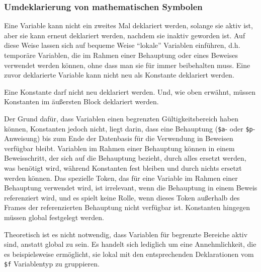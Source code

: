 \subsubsection{Umdeklarierung von mathematischen Symbolen}
\label{redeclaration}


Eine Variable kann nicht ein zweites Mal deklariert werden, solange sie aktiv ist, aber sie kann erneut deklariert werden, nachdem sie inaktiv geworden ist.  Auf diese Weise lassen sich auf bequeme Weise "`lokale"' Variablen einführen, d.h. temporäre Variablen, die im Rahmen einer Behauptung oder eines Beweises verwendet werden können, ohne dass man sie für immer beibehalten muss.  Eine zuvor deklarierte Variable kann nicht neu als Konstante deklariert werden.

Eine Konstante darf nicht neu deklariert werden.  Und, wie oben erwähnt, müssen Konstanten im äußersten Block deklariert werden.

Der Grund dafür, dass Variablen einen begrenzten Gültigkeitsbereich haben können, Konstanten jedoch nicht, liegt darin, dass eine Behauptung (\texttt{\$a}- oder \texttt{\$p}-Anweisung) bis zum Ende der Datenbasis für die Verwendung in Beweisen verfügbar bleibt.  Variablen im Rahmen einer Behauptung können in einem Beweisschritt, der sich auf die Behauptung bezieht, durch alles ersetzt werden, was benötigt wird, während Konstanten fest bleiben und durch nichts ersetzt werden können.  Das spezielle Token, das für eine Variable im Rahmen einer Behauptung verwendet wird, ist irrelevant, wenn die Behauptung in einem Beweis referenziert wird, und es spielt keine Rolle, wenn dieses Token außerhalb des Frames der referenzierten Behauptung nicht verfügbar ist. Konstanten hingegen müssen global festgelegt werden.

Theoretisch ist es nicht notwendig, dass Variablen für begrenzte Bereiche aktiv sind, anstatt global zu sein. Es handelt sich lediglich um eine Annehmlichkeit, die es beispielsweise ermöglicht, sie lokal mit den entsprechenden Deklarationen vom \texttt{\$f} Variablentyp zu gruppieren.

